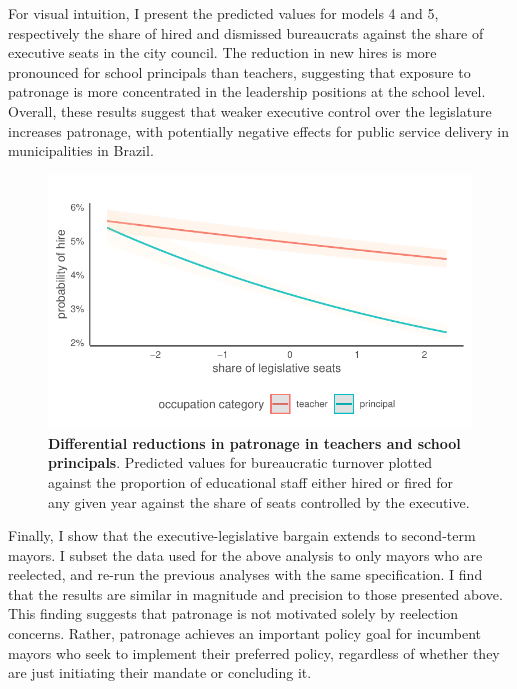 \documentclass[12pt,a4paper]{article}
\begin{document}
For visual intuition, I present the predicted values for models 4 and 5, respectively the share of hired and dismissed bureaucrats against the share of executive seats in the city council. The reduction in new hires is more pronounced for school principals than teachers, suggesting that exposure to patronage is more concentrated in the leadership positions at the school level. Overall, these results suggest that weaker executive control over the legislature increases patronage, with potentially negative effects for public service delivery in municipalities in Brazil.

\begin{figure}[h]
    \centering
    \includegraphics{plots/plot_interactions_logit}
    \caption{\textbf{Differential reductions in patronage in teachers and school principals}. Predicted values for bureaucratic turnover plotted against the proportion of educational staff either hired or fired for any given year against the share of seats controlled by the executive.}
    \label{fig:turnover}
\end{figure}

Finally, I show that the executive-legislative bargain extends to second-term mayors. I subset the data used for the above analysis to only mayors who are reelected, and re-run the previous analyses with the same specification. I find that the results are similar in magnitude and precision to those presented above. This finding suggests that patronage is not motivated solely by reelection concerns. Rather, patronage achieves an important policy goal for incumbent mayors who seek to implement their preferred policy, regardless of whether they are just initiating their mandate or concluding it.
\end{document}
